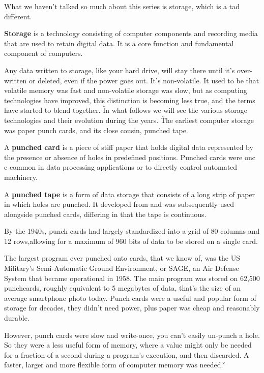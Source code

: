 What we haven't talked so much about this series is storage, which is a tad different.

\bd[Storage]
\textbf{Storage} is a technology consisting of computer components and recording media that are used to retain
digital data. It is a core function and fundamental component of computers.
\ed

Any data written to storage, like your hard drive, will stay there until it's over-written or deleted, even if the
power goes out. It's non-volatile. It used to be that volatile memory was fast and non-volatile storage was slow, but
as computing technologies have improved, this distinction is becoming less true, and the terms have started to blend
together. \v

In what follows we will see the various storage technologies and their evolution during the years. \v

The earliest computer storage was paper punch cards, and its close cousin, punched tape.

A \textbf{punched card} is a piece of stiff paper that holds digital data represented by the presence or absence of
holes in predefined positions. Punched cards were onc e common in data processing applications or to directly control
automated machinery.
\ed

A \textbf{punched tape} is a form of data storage that consists of a long strip of paper in which holes are punched.
It developed from and was subsequently used alongside punched cards, differing in that the tape is continuous.
\ed


By the 1940s, punch cards had largely standardized into a grid of 80 columns and 12 rows,allowing for a maximum of
960 bits of data to be stored on a single card.

\be
The largest program ever punched onto cards, that we know of, was the US Military's Semi-Automatic Ground
Environment, or SAGE, an Air Defense System that became operational in 1958. The main program was stored on 62,500
punchcards, roughly equivalent to 5 megabytes of data, that's the size of an average smartphone photo today. Punch
cards were a useful and popular form of storage for decades, they didn't need power, plus paper was cheap and
reasonably durable.
\ee

However, punch cards were slow and write-once, you can't easily un-punch a hole. So they were a less useful form of
memory, where a value might only be needed for a fraction of a second during a program's execution, and then
discarded. A faster, larger and more flexible form of computer memory was needed. \v

